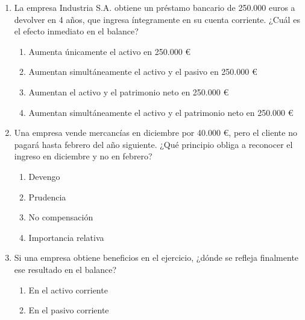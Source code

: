 \begin{enumerate}
    \begin{enumerate}
        \item Regustar el gasto solo en 2026, cuando se conozca con certeza la pérdida.
        \item Registar el gasto y la provisión correspondiente en 2025, por aplicación tanto del principio de prudencia como principio de devengo.
        \item No registar ninguna provisión, ya que la obligación no es cierta y la sentencia aún no se ha dictado. Lo que hay que registar es un pago con la cuantía notificada por el departamento jurídico.
        \item Registar la provisión correspondiente este año y el gasto el año siguiente
    \end{enumerate}
    \item La empresa Industria S.A. obtiene un préstamo bancario de 250.000 euros a devolver en 4 años, que ingresa íntegramente en su cuenta corriente. ¿Cuál es el efecto inmediato en el balance?
    \begin{enumerate}
        \item Aumenta únicamente el activo en 250.000 €
        \item Aumentan simultáneamente el activo y el pasivo en 250.000 €
        \item Aumentan el activo y el patrimonio neto en 250.000 €
        \item Aumentan simultáneamente el activo y el patrimonio neto en 250.000 €
    \end{enumerate}
    \item Una empresa vende mercancías en diciembre por 40.000 €, pero el cliente no pagará hasta febrero del año siguiente. ¿Qué principio obliga a reconocer el ingreso en diciembre y no en febrero?
    \begin{enumerate}
        \item Devengo
        \item Prudencia
        \item No compensación
        \item Importancia relativa
    \end{enumerate}
    \item Si una empresa obtiene beneficios en el ejercicio, ¿dónde se refleja finalmente ese resultado en el balance?
    \begin{enumerate}
        \item En el activo corriente
        \item En el pasivo corriente

\end{enumerate}
\end{enumerate}
